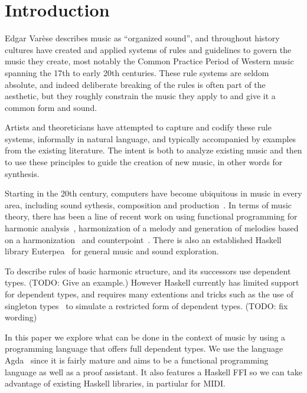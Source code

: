 \section{Introduction}
\label{sec:intro}

Edgar Var\`{e}se describes music as ``organized sound'', and
throughout history cultures have created and applied systems of rules
and guidelines to govern the music they create, most notably the
Common Practice Period of Western music spanning the 17th to early
20th centuries. These rule systems are seldom absolute, and indeed
deliberate breaking of the rules is often part of the aesthetic, but they
roughly constrain the music they apply to and
give it a common form and sound.

Artists and theoreticians have attempted to capture and codify these
rule systems, informally in natural language, and typically
accompanied by examples from the existing literature. The intent is
both to analyze existing music and then to use these principles to
guide the creation of new music, in other words for synthesis.

Starting in the 20th century, computers have become ubiquitous in
music in every area, including sound sythesis, composition and
production~\citep{roads-tutorial}. In terms of music theory, there has
been a line of recent work on using functional programming for
harmonic
analysis~\citep{magalhaes-harmtrace,dehaas-harmtrace-a,dehaas-harmtrace-b},
harmonization of a melody and generation of melodies based on a
harmonization~\citep{koops-fharm,magalhaes-fcomp} and
counterpoint~\citep{szamozvancev-welltyped}. There is also an
established Haskell library Euterpea~\citep{hudak-haskell} for general music
and sound exploration.

To describe rules of basic harmonic structure,
\citet{magalhaes-harmtrace} and its successors use dependent
types. (TODO: Give an example.) However Haskell currently has limited
support for dependent types, and requires many extentions and tricks
such as the use of singleton types~\citep{eisenberg-singleton} to
simulate a restricted form of dependent types. (TODO: fix wording)

In this paper we explore what can be done in the context of music by
using a programming language that offers full dependent types. We use
the language Agda~\citep{norell-phd} since it is fairly mature and
aims to be a functional programming language as well as a proof
assistant. It also features a Haskell FFI so we can take advantage of
existing Haskell libraries, in partiular for MIDI.

